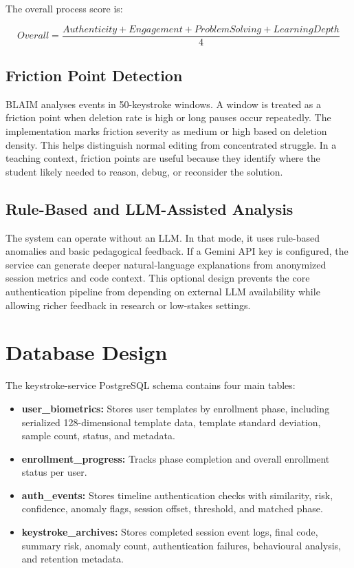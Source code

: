 The overall process score is:

\begin{equation}
Overall = \frac{Authenticity + Engagement + ProblemSolving + LearningDepth}{4}
\end{equation}

\subsection{Friction Point Detection}
\label{subsec:friction-detection}

BLAIM analyses events in 50-keystroke windows. A window is treated as a friction point when deletion rate is high or long pauses occur repeatedly. The implementation marks friction severity as medium or high based on deletion density. This helps distinguish normal editing from concentrated struggle. In a teaching context, friction points are useful because they identify where the student likely needed to reason, debug, or reconsider the solution.

\subsection{Rule-Based and LLM-Assisted Analysis}
\label{subsec:rule-llm}

The system can operate without an LLM. In that mode, it uses rule-based anomalies and basic pedagogical feedback. If a Gemini API key is configured, the service can generate deeper natural-language explanations from anonymized session metrics and code context. This optional design prevents the core authentication pipeline from depending on external LLM availability while allowing richer feedback in research or low-stakes settings.

\section{Database Design}
\label{sec:database-design}

The keystroke-service PostgreSQL schema contains four main tables:

\begin{itemize}
  \item \textbf{user\_biometrics:} Stores user templates by enrollment phase, including serialized 128-dimensional template data, template standard deviation, sample count, status, and metadata.
  \item \textbf{enrollment\_progress:} Tracks phase completion and overall enrollment status per user.
  \item \textbf{auth\_events:} Stores timeline authentication checks with similarity, risk, confidence, anomaly flags, session offset, threshold, and matched phase.
  \item \textbf{keystroke\_archives:} Stores completed session event logs, final code, summary risk, anomaly count, authentication failures, behavioural analysis, and retention metadata.
\end{itemize}

